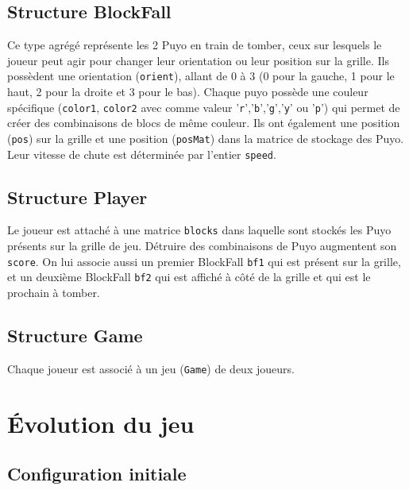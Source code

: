 \documentclass[11pt, final]{report}
\renewcommand{\tt}[1]{\texttt{#1}}
\begin{document}
\subsection{Structure BlockFall}



Ce type agrégé représente les 2 Puyo en train de tomber, ceux sur lesquels le joueur peut agir pour changer leur orientation ou leur position sur la grille. Ils possèdent une orientation (\tt{orient}), allant de 0 à 3 (0 pour la gauche, 1 pour le haut, 2 pour la droite et 3 pour le bas). Chaque puyo possède une couleur spécifique (\tt{color1}, \tt{color2} avec comme valeur '\tt{r}','\tt{b}','\tt{g}','\tt{y}' ou '\tt{p}') qui permet de créer des combinaisons de blocs de même couleur. Ils ont également une position (\tt{pos}) sur la grille et une position (\tt{posMat}) dans la matrice de stockage des Puyo. Leur vitesse de chute est déterminée par l'entier \tt{speed}.  
\\

\subsection{Structure Player}



Le joueur est attaché à une matrice \tt{blocks} dans laquelle sont stockés les Puyo présents sur la grille de jeu. Détruire des combinaisons de Puyo augmentent son \tt{score}. On lui associe aussi un premier BlockFall \tt{bf1} qui est présent sur la grille, et un deuxième BlockFall \tt{bf2} qui est affiché à côté de la grille et qui est le prochain à tomber. 
\\

\subsection{Structure Game}



Chaque joueur est associé à un jeu (\tt{Game}) de deux joueurs.
\\

\section{Évolution du jeu}

\subsection{Configuration initiale}
\end{document}
